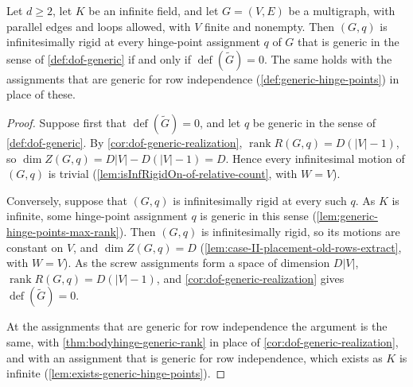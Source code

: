 \begin{corollary}
  \label{cor:bodyhinge-generic-rigid}
  \leanok
  Let $d \ge 2$, let $K$ be an infinite field, and let $G = (V, E)$ be
  a multigraph, with parallel edges and loops allowed, with $V$ finite
  and nonempty. Then $(G, q)$ is
  infinitesimally rigid at every hinge-point assignment $q$ of $G$ that
  is generic in the sense of \cref{def:dof-generic} if and only if
  $\operatorname{def}(\tilde G) = 0$. The same holds with the
  assignments that are generic for row independence
  (\cref{def:generic-hinge-points}) in place of these.
\end{corollary}
\begin{proof}
  \leanok
  Suppose first that $\operatorname{def}(\tilde G) = 0$, and let $q$ be
  generic in the sense of \cref{def:dof-generic}. By
  \cref{cor:dof-generic-realization},
  $\operatorname{rank} R(G,q) = D(|V|-1)$, so
  $\dim Z(G,q) = D|V| - D(|V|-1) = D$. Hence every infinitesimal
  motion of $(G, q)$ is trivial
  (\cref{lem:isInfRigidOn-of-relative-count}, with $W = V$).

  Conversely, suppose that $(G, q)$ is infinitesimally rigid at every
  such $q$. As $K$ is infinite, some hinge-point assignment $q$ is
  generic in this sense (\cref{lem:generic-hinge-points-max-rank}).
  Then $(G, q)$ is infinitesimally rigid, so its motions are constant
  on $V$, and $\dim Z(G,q) = D$
  (\cref{lem:case-II-placement-old-rows-extract}, with $W = V$). As the
  screw assignments form a space of dimension $D|V|$,
  $\operatorname{rank} R(G,q) = D(|V|-1)$, and
  \cref{cor:dof-generic-realization} gives
  $\operatorname{def}(\tilde G) = 0$.

  At the assignments that are generic for row independence the
  argument is the same, with \cref{thm:bodyhinge-generic-rank} in place
  of \cref{cor:dof-generic-realization}, and with an assignment that is
  generic for row independence, which exists as $K$ is infinite
  (\cref{lem:exists-generic-hinge-points}).
\end{proof}

